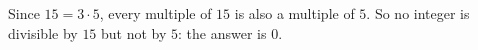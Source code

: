 Since $15=3\cdot5$, every multiple of $15$ is also a multiple of $5$. So no integer is divisible by $15$ but not by $5$: the answer is $\boxed{0}$.

